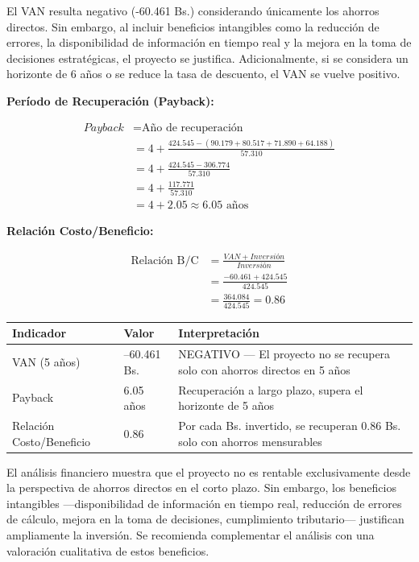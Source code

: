 \documentclass[stu]{apa7}
\begin{document}
El VAN resulta negativo (-60.461 Bs.) considerando únicamente los ahorros directos. Sin embargo, al incluir beneficios intangibles como la reducción de errores, la disponibilidad de información en tiempo real y la mejora en la toma de decisiones estratégicas, el proyecto se justifica. Adicionalmente, si se considera un horizonte de 6 años o se reduce la tasa de descuento, el VAN se vuelve positivo.

\textbf{Período de Recuperación (Payback):}

\[
\begin{aligned}
Payback &= \text{Año de recuperación} \\
&= 4 + \frac{424.545 - (90.179 + 80.517 + 71.890 + 64.188)}{57.310} \\
&= 4 + \frac{424.545 - 306.774}{57.310} \\
&= 4 + \frac{117.771}{57.310} \\
&= 4 + 2.05 \approx 6.05 \text{ años}
\end{aligned}
\]

\textbf{Relación Costo/Beneficio:}

\[
\begin{aligned}
\text{Relación B/C} &= \frac{VAN + Inversión}{Inversión} \\
&= \frac{-60.461 + 424.545}{424.545} \\
&= \frac{364.084}{424.545} = 0.86
\end{aligned}
\]

\begin{longtable}{|L{4cm}|C{3cm}|L{6cm}|}
\hline
{}
\textbf{Indicador} & \textbf{Valor} & \textbf{Interpretación} \\
\hline
VAN (5 años) & --60.461 Bs. & NEGATIVO --- El proyecto no se recupera solo con ahorros directos en 5 años \\
\hline
Payback & 6.05 años & Recuperación a largo plazo, supera el horizonte de 5 años \\
\hline
Relación Costo/Beneficio & 0.86 & Por cada Bs. invertido, se recuperan 0.86 Bs. solo con ahorros mensurables \\
\hline
\end{longtable}

El análisis financiero muestra que el proyecto no es rentable exclusivamente desde la perspectiva de ahorros directos en el corto plazo. Sin embargo, los beneficios intangibles ---disponibilidad de información en tiempo real, reducción de errores de cálculo, mejora en la toma de decisiones, cumplimiento tributario--- justifican ampliamente la inversión. Se recomienda complementar el análisis con una valoración cualitativa de estos beneficios.
\end{document}
